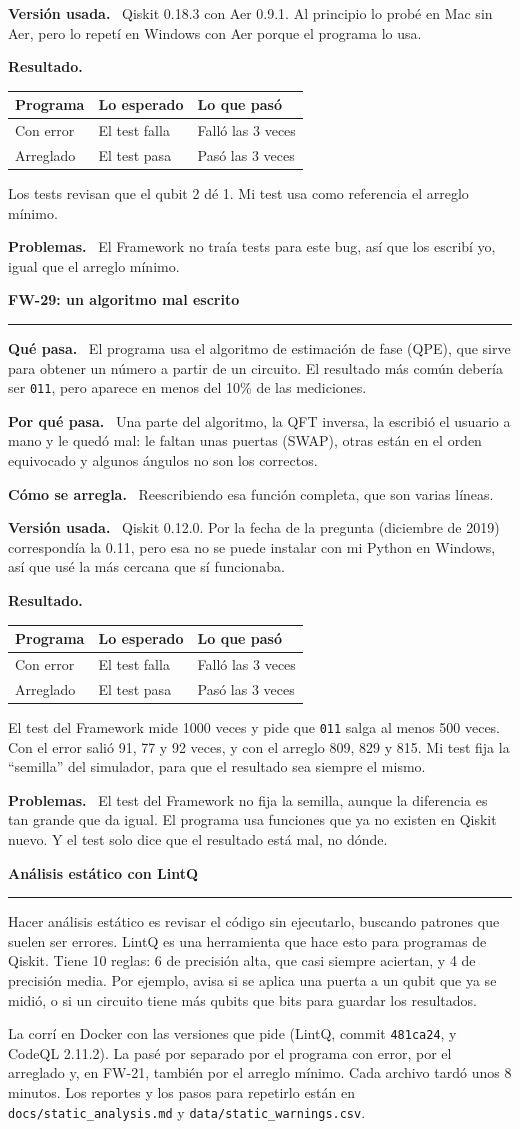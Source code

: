 \documentclass[11pt,a4paper]{article}
\newcommand{\paper}[1]{\vspace{1.2em}\par{\large\textbf{#1}}\par\vspace{0.2em}\hrule\vspace{0.4em}}
\newcommand{\parte}[1]{\par\textbf{#1.}\ }
\newcommand{\resultados}[1]{%
\begin{center}
\begin{tabular}{lll}
\toprule
Programa & Lo esperado & Lo que pasó \\
\midrule
Con error & El test falla & Falló las 3 veces \\
Arreglado & El test pasa & Pasó las 3 veces \\
\bottomrule
\end{tabular}
\end{center}}
\begin{document}
\parte{Versión usada}
Qiskit 0.18.3 con Aer 0.9.1. Al principio lo probé en Mac sin Aer, pero lo repetí en Windows con Aer porque el programa lo usa.

\parte{Resultado}
\resultados{21}
Los tests revisan que el qubit 2 dé 1. Mi test usa como referencia el arreglo mínimo.

\parte{Problemas}
El Framework no traía tests para este bug, así que los escribí yo, igual que el arreglo mínimo.

\paper{FW-29: un algoritmo mal escrito}

\parte{Qué pasa}
El programa usa el algoritmo de estimación de fase (QPE), que sirve para obtener un número a partir de un circuito. El resultado más común debería ser \texttt{011}, pero aparece en menos del 10\% de las mediciones.

\parte{Por qué pasa}
Una parte del algoritmo, la QFT inversa, la escribió el usuario a mano y le quedó mal: le faltan unas puertas (SWAP), otras están en el orden equivocado y algunos ángulos no son los correctos.

\parte{Cómo se arregla}
Reescribiendo esa función completa, que son varias líneas.

\parte{Versión usada}
Qiskit 0.12.0. Por la fecha de la pregunta (diciembre de 2019) correspondía la 0.11, pero esa no se puede instalar con mi Python en Windows, así que usé la más cercana que sí funcionaba.

\parte{Resultado}
\resultados{29}
El test del Framework mide 1000 veces y pide que \texttt{011} salga al menos 500 veces. Con el error salió 91, 77 y 92 veces, y con el arreglo 809, 829 y 815. Mi test fija la ``semilla'' del simulador, para que el resultado sea siempre el mismo.

\parte{Problemas}
El test del Framework no fija la semilla, aunque la diferencia es tan grande que da igual. El programa usa funciones que ya no existen en Qiskit nuevo. Y el test solo dice que el resultado está mal, no dónde.

\paper{Análisis estático con LintQ}

Hacer análisis estático es revisar el código sin ejecutarlo, buscando patrones que suelen ser errores. LintQ es una herramienta que hace esto para programas de Qiskit. Tiene 10 reglas: 6 de precisión alta, que casi siempre aciertan, y 4 de precisión media. Por ejemplo, avisa si se aplica una puerta a un qubit que ya se midió, o si un circuito tiene más qubits que bits para guardar los resultados.

La corrí en Docker con las versiones que pide (LintQ, commit \texttt{481ca24}, y CodeQL 2.11.2). La pasé por separado por el programa con error, por el arreglado y, en FW-21, también por el arreglo mínimo. Cada archivo tardó unos 8 minutos. Los reportes y los pasos para repetirlo están en \texttt{docs/static\_analysis.md} y \texttt{data/static\_warnings.csv}.
\end{document}
